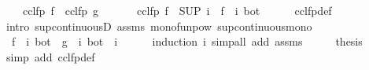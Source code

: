 \begin{isabellebody}
\ \ \ {\isachardoublequoteopen}{\isasymalpha}\ {\isacharparenleft}cclfp\ f{\isacharparenright}\ {\isacharequal}\ cclfp\ g{\isachardoublequoteclose}\isanewline
%
\isadelimproof
%
\endisadelimproof
%
\isatagproof
{}\isamarkupfalse%
\ {\isacharminus}\isanewline
\ \ \isamarkupfalse%
\ {\isachardoublequoteopen}{\isasymalpha}\ {\isacharparenleft}cclfp\ f{\isacharparenright}\ {\isacharequal}\ {\isacharparenleft}SUP\ i{\isachardot}\ {\isasymalpha}\ {\isacharparenleft}{\isacharparenleft}f\ {\isacharcircum}{\isacharcircum}\ i{\isacharparenright}\ bot{\isacharparenright}{\isacharparenright}{\isachardoublequoteclose}\isanewline
\ \ \ \ \isamarkupfalse%
\ cclfp{\isacharunderscore}def\ \isamarkupfalse%
\ {\isacharparenleft}intro\ sup{\isacharunderscore}continuousD\ assms\ mono{\isacharunderscore}funpow\ sup{\isacharunderscore}continuous{\isacharunderscore}mono{\isacharparenright}\isanewline
\ \ \isamarkupfalse%
\ \isamarkupfalse%
\ {\isachardoublequoteopen}{\isasymalpha}\ {\isacharparenleft}{\isacharparenleft}f\ {\isacharcircum}{\isacharcircum}\ i{\isacharparenright}\ bot{\isacharparenright}\ {\isacharequal}\ {\isacharparenleft}g\ {\isacharcircum}{\isacharcircum}\ i{\isacharparenright}\ bot{\isachardoublequoteclose}\ \ i\isanewline
\ \ \ \ \isamarkupfalse%
\ {\isacharparenleft}induction\ i{\isacharparenright}\ {\isacharparenleft}simp{\isacharunderscore}all\ add{\isacharcolon}\ assms{\isacharparenright}\isanewline
\ \ \isamarkupfalse%
\ \isamarkupfalse%
\ {\isacharquery}thesis\isanewline
\ \ \ \ \isamarkupfalse%
\ {\isacharparenleft}simp\ add{\isacharcolon}\ cclfp{\isacharunderscore}def{\isacharparenright}\isanewline
{}\isamarkupfalse%
%
\endisatagproof
{\isafoldproof}%
%
\isadelimproof
\isanewline
%
\endisadelimproof
%
\isadelimtheory
\isanewline
%
\endisadelimtheory
%
\isatagtheory
{}\isamarkupfalse%
%
\endisatagtheory
{\isafoldtheory}%
%
\isadelimtheory
%
\endisadelimtheory
%
\end{isabellebody}%
\endinput

